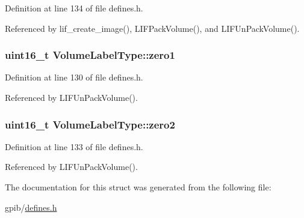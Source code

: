 Definition at line 134 of file defines.\+h.



Referenced by lif\+\_\+create\+\_\+image(), L\+I\+F\+Pack\+Volume(), and L\+I\+F\+Un\+Pack\+Volume().

\subsubsection[{\texorpdfstring{zero1}{zero1}}]{\setlength{\rightskip}{0pt plus 5cm}uint16\+\_\+t Volume\+Label\+Type\+::zero1}\hypertarget{structVolumeLabelType_a741f3741367c9c73ba24d15ac0b0e3a4}{}\label{structVolumeLabelType_a741f3741367c9c73ba24d15ac0b0e3a4}


Definition at line 130 of file defines.\+h.



Referenced by L\+I\+F\+Un\+Pack\+Volume().

\subsubsection[{\texorpdfstring{zero2}{zero2}}]{\setlength{\rightskip}{0pt plus 5cm}uint16\+\_\+t Volume\+Label\+Type\+::zero2}\hypertarget{structVolumeLabelType_a18c623a319ca760c0ad57ff96346e54f}{}\label{structVolumeLabelType_a18c623a319ca760c0ad57ff96346e54f}


Definition at line 133 of file defines.\+h.



Referenced by L\+I\+F\+Un\+Pack\+Volume().



The documentation for this struct was generated from the following file\+:\begin{DoxyCompactItemize}
\item 
gpib/\hyperlink{defines_8h}{defines.\+h}\end{DoxyCompactItemize}
